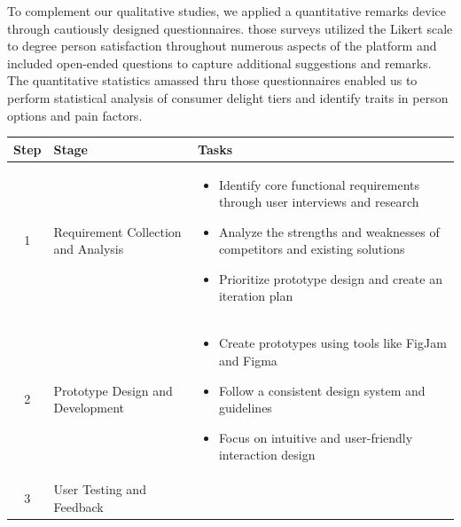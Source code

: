 To complement our qualitative studies, we applied a quantitative remarks device through cautiously designed questionnaires. those surveys utilized the Likert scale to degree person satisfaction throughout numerous aspects of the platform and included open-ended questions to capture additional suggestions and remarks. The quantitative statistics amassed thru those questionnaires enabled us to perform statistical analysis of consumer delight tiers and identify traits in person options and pain factors.
\begin{table}[h!]
    \centering
    \renewcommand{\arraystretch}{1.5}
    \begin{tabular}{|c|p{4cm}|p{10cm}|}
    \hline
    \textbf{Step} & \textbf{Stage}           & \textbf{Tasks}                                                                                 \\ \hline
    1             & Requirement Collection and Analysis & \begin{itemize}
                                                            \item Identify core functional requirements through user interviews and research
                                                            \item Analyze the strengths and weaknesses of competitors and existing solutions
                                                            \item Prioritize prototype design and create an iteration plan
                                                        \end{itemize}                                                                                  \\ \hline
    2             & Prototype Design and Development & \begin{itemize}
                                                        \item Create prototypes using tools like FigJam and Figma
                                                        \item Follow a consistent design system and guidelines
                                                        \item Focus on intuitive and user-friendly interaction design
                                                    \end{itemize}                                                                                  \\ \hline
    3             & User Testing and Feedback & \begin{itemize}

\end{itemize}
\end{tabular}
\end{table}
